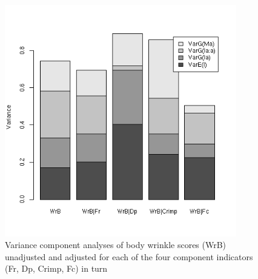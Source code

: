 %

\begin{figure}[!h]
  \centering
   \includegraphics[width=0.9\textwidth]{wrbcov.png}
  \caption{Variance component analyses of body wrinkle scores (WrB)  unadjusted and adjusted for each of the four component indicators (Fr, Dp, Crimp, Fc) in turn}
  \label{fig:wrbcov}
\end{figure}

%

